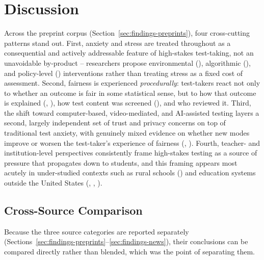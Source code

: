 \documentclass[11pt]{article}
\begin{document}
\section{Discussion}
\label{sec:discussion}

Across the preprint corpus (Section~\ref{sec:findings-preprints}), four cross-cutting patterns stand out. First, anxiety and stress are treated throughout as a consequential and actively addressable feature of high-stakes test-taking, not an unavoidable by-product -- researchers propose environmental (\citet{amsberry2018sound}), algorithmic (\citet{watson2026cat}), and policy-level (\citet{zhangw2024naplan}) interventions rather than treating stress as a fixed cost of assessment. Second, fairness is experienced \emph{procedurally}: test-takers react not only to whether an outcome is fair in some statistical sense, but to how that outcome is explained (\citet{feeney2022rejection}, \citet{stierwalt2000explanations}), how test content was screened (\citet{grand2013sensitivity}), and who reviewed it. Third, the shift toward computer-based, video-mediated, and AI-assisted testing layers a second, largely independent set of trust and privacy concerns on top of traditional test anxiety, with genuinely mixed evidence on whether new modes improve or worsen the test-taker's experience of fairness (\citet{zhang2023testtakers}, \citet{mukherjee2024proctoring}). Fourth, teacher- and institution-level perspectives consistently frame high-stakes testing as a source of pressure that propagates down to students, and this framing appears most acutely in under-studied contexts such as rural schools (\citet{steuart2024ruralteachers}) and education systems outside the United States (\citet{mccauley2021irish}, \citet{tseng2024taiwanese}, \citet{dang2024vstep}).

\subsection{Cross-Source Comparison}
\label{sec:crosssource}

Because the three source categories are reported separately (Sections~\ref{sec:findings-preprints}--\ref{sec:findings-news}), their conclusions can be compared directly rather than blended, which was the point of separating them.
\end{document}
